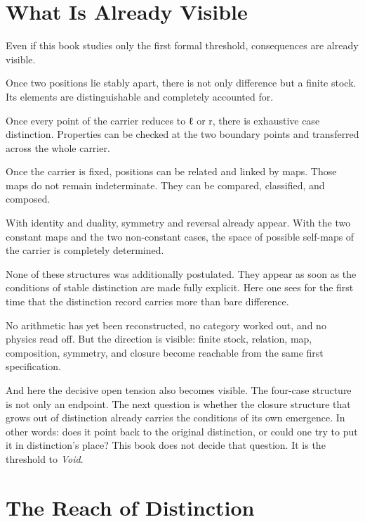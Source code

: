 \documentclass[11pt,a4paper]{book}
\def\texttt#1{#1}%
\begin{document}
\chapter{What Is Already Visible}
\label{ch:already-visible}

Even if this book studies only the first formal threshold, consequences are
already visible.

Once two positions lie stably apart, there is not only difference but a
finite stock. Its elements are distinguishable and completely accounted for.

Once every point of the carrier reduces to \texttt{ℓ} or \texttt{r}, there
is exhaustive case distinction. Properties can be checked at the two
boundary points and transferred across the whole carrier.

Once the carrier is fixed, positions can be related and linked by maps.
Those maps do not remain indeterminate. They can be compared, classified,
and composed.

With identity and duality, symmetry and reversal already appear. With the
two constant maps and the two non-constant cases, the space of possible
self-maps of the carrier is completely determined.

None of these structures was additionally postulated. They appear as soon as
the conditions of stable distinction are made fully explicit. Here one sees
for the first time that the distinction record carries more than bare
difference.

No arithmetic has yet been reconstructed, no category worked out, and no
physics read off. But the direction is visible: finite stock, relation, map,
composition, symmetry, and closure become reachable from the same first
specification.

And here the decisive open tension also becomes visible. The four-case
structure is not only an endpoint. The next question is whether the closure
structure that grows out of distinction already carries the conditions of
its own emergence. In other words: does it point back to the original
distinction, or could one try to put it in distinction's place? This book
does not decide that question. It is the threshold to \textit{Void}.

\chapter{The Reach of Distinction}
\label{ch:outlook}
\label{ch:reach}
\end{document}

